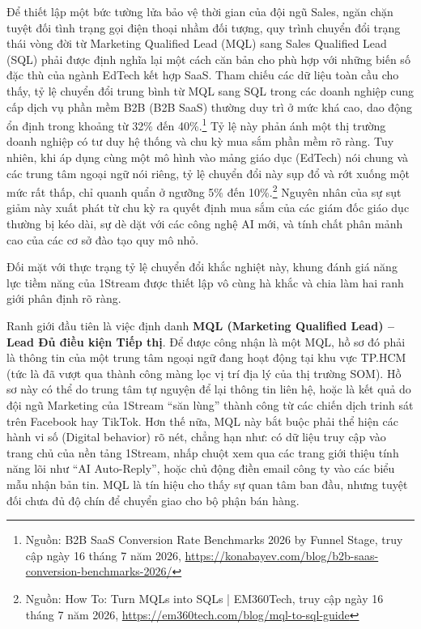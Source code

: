 Để thiết lập một bức tường lửa bảo vệ thời gian của đội ngũ Sales, ngăn chặn tuyệt đối tình trạng gọi điện thoại nhầm đối tượng, quy trình chuyển đổi trạng thái vòng đời từ Marketing Qualified Lead (MQL) sang Sales Qualified Lead (SQL) phải được định nghĩa lại một cách căn bản cho phù hợp với những biến số đặc thù của ngành EdTech kết hợp SaaS. Tham chiếu các dữ liệu toàn cầu cho thấy, tỷ lệ chuyển đổi trung bình từ MQL sang SQL trong các doanh nghiệp cung cấp dịch vụ phần mềm B2B (B2B SaaS) thường duy trì ở mức khá cao, dao động ổn định trong khoảng từ 32\% đến 40\%.\footnote{Nguồn: B2B SaaS Conversion Rate Benchmarks 2026 by Funnel Stage, truy cập ngày 16 tháng 7 năm 2026, \url{https://konabayev.com/blog/b2b-saas-conversion-benchmarks-2026/}} Tỷ lệ này phản ánh một thị trường doanh nghiệp có tư duy hệ thống và chu kỳ mua sắm phần mềm rõ ràng. Tuy nhiên, khi áp dụng cùng một mô hình vào mảng giáo dục (EdTech) nói chung và các trung tâm ngoại ngữ nói riêng, tỷ lệ chuyển đổi này sụp đổ và rớt xuống một mức rất thấp, chỉ quanh quẩn ở ngưỡng 5\% đến 10\%.\footnote{Nguồn: How To: Turn MQLs into SQLs | EM360Tech, truy cập ngày 16 tháng 7 năm 2026, \url{https://em360tech.com/blog/mql-to-sql-guide}} Nguyên nhân của sự sụt giảm này xuất phát từ chu kỳ ra quyết định mua sắm của các giám đốc giáo dục thường bị kéo dài, sự dè dặt với các công nghệ AI mới, và tính chất phân mảnh cao của các cơ sở đào tạo quy mô nhỏ.

Đối mặt với thực trạng tỷ lệ chuyển đổi khắc nghiệt này, khung đánh giá năng lực tiềm năng của 1Stream được thiết lập vô cùng hà khắc và chia làm hai ranh giới phân định rõ ràng.

Ranh giới đầu tiên là việc định danh \textbf{MQL (Marketing Qualified Lead) -- Lead Đủ điều kiện Tiếp thị}. Để được công nhận là một MQL, hồ sơ đó phải là thông tin của một trung tâm ngoại ngữ đang hoạt động tại khu vực TP.HCM (tức là đã vượt qua thành công màng lọc vị trí địa lý của thị trường SOM). Hồ sơ này có thể do trung tâm tự nguyện để lại thông tin liên hệ, hoặc là kết quả do đội ngũ Marketing của 1Stream ``săn lùng'' thành công từ các chiến dịch trinh sát trên Facebook hay TikTok. Hơn thế nữa, MQL này bắt buộc phải thể hiện các hành vi số (Digital behavior) rõ nét, chẳng hạn như: có dữ liệu truy cập vào trang chủ của nền tảng 1Stream, nhấp chuột xem qua các trang giới thiệu tính năng lõi như ``AI Auto-Reply'', hoặc chủ động điền email công ty vào các biểu mẫu nhận bản tin. MQL là tín hiệu cho thấy sự quan tâm ban đầu, nhưng tuyệt đối chưa đủ độ chín để chuyển giao cho bộ phận bán hàng.

